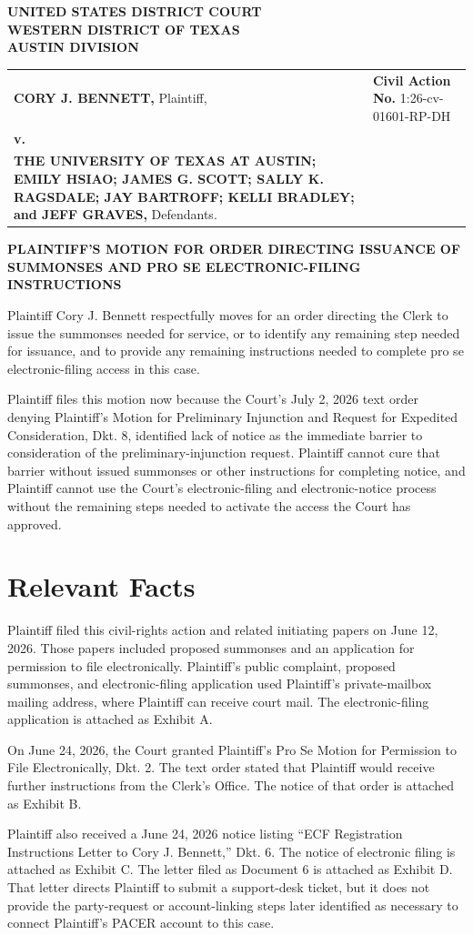 \documentclass[12pt]{article}
\makeatletter
\providecommand{\FilingCourtName}{UNITED STATES DISTRICT COURT}
\providecommand{\FilingDistrictName}{WESTERN DISTRICT OF TEXAS}
\providecommand{\FilingDivisionName}{AUSTIN DIVISION}
\providecommand{\FilingPlaintiffNameUpper}{CORY J. BENNETT}
\providecommand{\FilingDefendantsInlineUpper}{THE UNIVERSITY OF TEXAS AT AUSTIN; EMILY HSIAO; JAMES G. SCOTT; SALLY K. RAGSDALE; JAY BARTROFF; KELLI BRADLEY; and JEFF GRAVES}
\providecommand{\FilingCivilActionNumber}{}
\renewcommand{\FilingCivilActionNumber}{1:26-cv-01601-RP-DH}
\newcommand{\Caption}{%
  \begin{singlespace}
  \begin{center}
  \textbf{\FilingCourtName}\\
  \textbf{\FilingDistrictName}\\
  \textbf{\FilingDivisionName}
  \end{center}

  \vspace{0.45em}

  \noindent
  \begin{tabularx}{\textwidth}{@{}>{\raggedright\arraybackslash}X>{\raggedright\arraybackslash}p{2.95in}@{}}
  \textbf{\FilingPlaintiffNameUpper,} Plaintiff, & \textbf{Civil Action No.} \FilingCivilActionNumber \\
  \textbf{v.} & \\
  \textbf{\FilingDefendantsInlineUpper,} Defendants. & \\
  \end{tabularx}

  \vspace{1.0em}
  \end{singlespace}%
}
\makeatother
\begin{document}
\Caption

\begin{singlespace}
\begin{center}
\textbf{PLAINTIFF'S MOTION FOR ORDER DIRECTING ISSUANCE OF}\\
\textbf{SUMMONSES AND PRO SE ELECTRONIC-FILING INSTRUCTIONS}
\end{center}
\end{singlespace}

Plaintiff Cory J. Bennett respectfully moves for an order directing the Clerk to issue the summonses needed for service, or to identify any remaining step needed for issuance, and to provide any remaining instructions needed to complete pro se electronic-filing access in this case.

Plaintiff files this motion now because the Court's July 2, 2026 text order denying Plaintiff's Motion for Preliminary Injunction and Request for Expedited Consideration, Dkt. 8, identified lack of notice as the immediate barrier to consideration of the preliminary-injunction request. Plaintiff cannot cure that barrier without issued summonses or other instructions for completing notice, and Plaintiff cannot use the Court's electronic-filing and electronic-notice process without the remaining steps needed to activate the access the Court has approved.

\section*{Relevant Facts}

Plaintiff filed this civil-rights action and related initiating papers on June 12, 2026. Those papers included proposed summonses and an application for permission to file electronically. Plaintiff's public complaint, proposed summonses, and electronic-filing application used Plaintiff's private-mailbox mailing address, where Plaintiff can receive court mail. The electronic-filing application is attached as Exhibit A.

On June 24, 2026, the Court granted Plaintiff's Pro Se Motion for Permission to File Electronically, Dkt. 2. The text order stated that Plaintiff would receive further instructions from the Clerk's Office. The notice of that order is attached as Exhibit B.

Plaintiff also received a June 24, 2026 notice listing ``ECF Registration Instructions Letter to Cory J. Bennett,'' Dkt. 6. The notice of electronic filing is attached as Exhibit C. The letter filed as Document 6 is attached as Exhibit D. That letter directs Plaintiff to submit a support-desk ticket, but it does not provide the party-request or account-linking steps later identified as necessary to connect Plaintiff's PACER account to this case.
\end{document}
